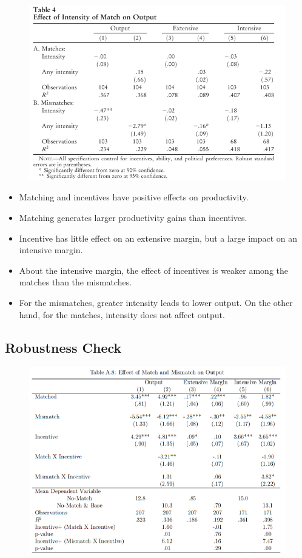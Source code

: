 \documentclass[../root]{subfiles}
\begin{document}
    \begin{figure}[h]
        \centering
        \includegraphics[width = 0.8\linewidth]{os0602kato/reg2.PNG}
        \label{Result: Regression 2}
    \end{figure}

    \begin{itemize}
        \item Matching and incentives have positive effects on productivity.
        \item Matching generates larger productivity gains than incentives.
        \item Incentive has little effect on an extensive margin, but a large impact on an intensive margin.
        \item About the intensive margin, the effect of incentives is weaker among the matches than the mismatches.
        \item For the mismatches, greater intensity leads to lower output. On the other hand, for the matches, intensity does not affect output.
    \end{itemize}


    \clearpage
    \subsection{Robustness Check}

    \begin{figure}[h]
        \centering
        \includegraphics[width = 0.8\linewidth]{os0602kato/reg3.PNG}
        \label{Result: Regression 3}
    \end{figure}
\end{document}
